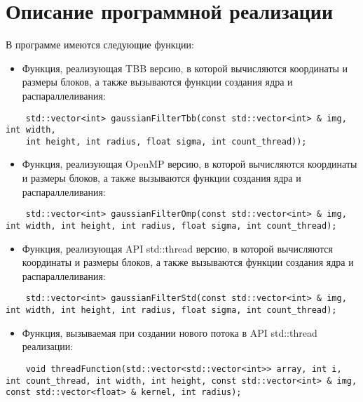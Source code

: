 \documentclass{report}
\begin{document}
\section*{Описание программной реализации}
В программе имеются следующие функции:

\begin{itemize}
\item Функция, реализующая TBB версию, в которой вычисляются координаты и размеры блоков, а также вызываются функции создания ядра и распараллеливания: 
\end{itemize}
\begin{lstlisting}
	std::vector<int> gaussianFilterTbb(const std::vector<int> & img, int width,
    int height, int radius, float sigma, int count_thread));
\end{lstlisting}
\begin{itemize}
\item Функция, реализующая OpenMP версию, в которой вычисляются координаты и размеры блоков, а также вызываются функции создания ядра и распараллеливания: 
\end{itemize}
\begin{lstlisting}
	std::vector<int> gaussianFilterOmp(const std::vector<int> & img, int width, int height, int radius, float sigma, int count_thread);
\end{lstlisting}
\begin{itemize}
\item Функция, реализующая API std::thread версию, в которой вычисляются координаты и размеры блоков, а также вызываются функции создания ядра и распараллеливания: 
\end{itemize}
\begin{lstlisting}
	std::vector<int> gaussianFilterStd(const std::vector<int> & img, int width, int height, int radius, float sigma, int count_thread);
\end{lstlisting}
\begin{itemize}
\item Функция, вызываемая при создании нового потока в API std::thread реализации: 
\end{itemize}
\begin{lstlisting}
	void threadFunction(std::vector<std::vector<int>> array, int i, int count_thread, int width, int height, const std::vector<int> & img, const std::vector<float> & kernel, int radius);
\end{lstlisting}
\end{document}

